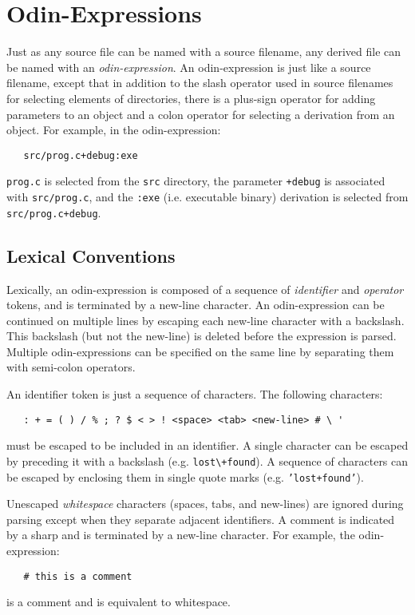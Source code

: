 \documentclass[hidelinks]{report}
\newcommand{\ex}{\tt}   %
\begin{document}
\section{Odin-Expressions}
\label{odinexpr}

Just as any source file can be named with a source filename,
any derived file can be named with an {\em odin-expression}.
An odin-expression is just like a source filename,
except that in addition to the slash operator used in source filenames
for selecting elements of directories,
there is a plus-sign operator for adding parameters to an object
and a colon operator for selecting a derivation from an object.
For example, in the odin-expression:
\begin{verbatim}
   src/prog.c+debug:exe
\end{verbatim}
{\ex prog.c} is selected from the {\ex src} directory,
the parameter {\ex +debug} is associated with {\ex src/prog.c},
and the {\ex :exe} (i.e. executable binary) derivation 
is selected from {\ex src/prog.c+debug}.

\subsection{Lexical Conventions}

Lexically, an odin-expression is composed of a sequence of 
{\em identifier} and {\em operator} tokens,
and is terminated by a new-line character.
An odin-expression can be continued on multiple lines
by escaping each new-line character with a backslash.
This backslash (but not the new-line) is deleted
before the expression is parsed.
Multiple odin-expressions can be specified on the same line
by separating them with semi-colon operators.

An identifier token is just a sequence of characters.
The following characters:
\begin{verbatim}
   : + = ( ) / % ; ? $ < > ! <space> <tab> <new-line> # \ ' 
\end{verbatim}
must be escaped to be included in an identifier.
A single character can be escaped by preceding it with a backslash
(e.g. {\ex lost\verb.\.+found}).
A sequence of characters can be escaped
by enclosing them in single quote marks (e.g. {\ex 'lost+found'}).

Unescaped {\em whitespace} characters (spaces, tabs, and new-lines)
are ignored during parsing except when they separate adjacent identifiers.
A comment is indicated by
a sharp and is terminated by a new-line character.
For example, the odin-expression:
\begin{verbatim}
   # this is a comment
\end{verbatim}
is a comment and is equivalent to whitespace.
\end{document}
